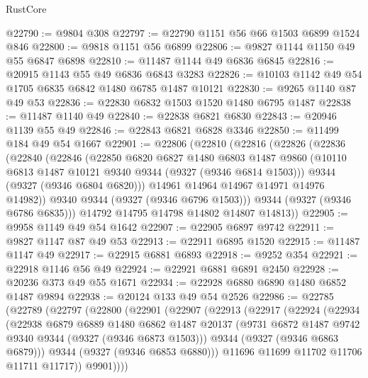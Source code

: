 \begin{lexlean}{RustCore}
\begin{coremodule}
@22790 := @9804 @308
@22797 := @22790 @1151 @56 @66 @1503 @6899 @1524 @846
@22800 := @9818 @1151 @56 @6899
@22806 := @9827 @1144 @1150 @49 @55 @6847 @6898
@22810 := @11487 @1144 @49 @6836 @6845
@22816 := @20915 @1143 @55 @49 @6836 @6843 @3283
@22826 := @10103 @1142 @49 @54 @1705 @6835 @6842 @1480 @6785 @1487 @10121
@22830 := @9265 @1140 @87 @49 @53
@22836 := @22830 @6832 @1503 @1520 @1480 @6795 @1487
@22838 := @11487 @1140 @49
@22840 := @22838 @6821 @6830
@22843 := @20946 @1139 @55 @49
@22846 := @22843 @6821 @6828 @3346
@22850 := @11499 @184 @49 @54 @1667
@22901 := @22806
    (@22810
      (@22816
        (@22826
          (@22836
            (@22840
              (@22846
                (@22850
                  @6820
                  @6827
                  @1480
                  @6803
                  @1487
                  @9860
                  (@10110 @6813 @1487 @10121 @9340 @9344 (@9327 (@9346 @6814 @1503)))
                  @9344
                  (@9327 (@9346 @6804 @6820)))
                @14961
                @14964
                @14967
                @14971
                @14976
                @14982))
            @9340
            @9344
            (@9327 (@9346 @6796 @1503)))
          @9344
          (@9327 (@9346 @6786 @6835)))
        @14792
        @14795
        @14798
        @14802
        @14807
        @14813))
@22905 := @9958 @1149 @49 @54 @1642
@22907 := @22905 @6897 @9742
@22911 := @9827 @1147 @87 @49 @53
@22913 := @22911 @6895 @1520
@22915 := @11487 @1147 @49
@22917 := @22915 @6881 @6893
@22918 := @9252 @354
@22921 := @22918 @1146 @56 @49
@22924 := @22921 @6881 @6891 @2450
@22928 := @20236 @373 @49 @55 @1671
@22934 := @22928 @6880 @6890 @1480 @6852 @1487 @9894
@22938 := @20124 @133 @49 @54 @2526
@22986 := @22785
    (@22789
      (@22797
        (@22800
          (@22901
            (@22907
              (@22913
                (@22917
                  (@22924
                    (@22934
                      (@22938
                        @6879
                        @6889
                        @1480
                        @6862
                        @1487
                        @20137
                        (@9731 @6872 @1487 @9742 @9340 @9344 (@9327 (@9346 @6873 @1503)))
                        @9344
                        (@9327 (@9346 @6863 @6879)))
                      @9344
                      (@9327 (@9346 @6853 @6880)))
                    @11696
                    @11699
                    @11702
                    @11706
                    @11711
                    @11717))
                @9901))))

\end{coremodule}
\end{lexlean}
